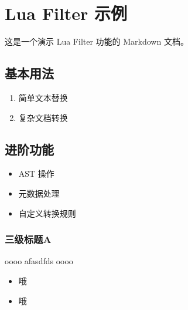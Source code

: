 \section{Lua Filter 示例}\label{lua-filter-ux793aux4f8b}

这是一个演示 Lua Filter 功能的 Markdown 文档。

\subsection{基本用法}\label{ux57faux672cux7528ux6cd5}

\begin{enumerate}
\tightlist
\item
  简单文本替换
\item
  复杂文档转换
\end{enumerate}

\begin{Shaded}
\begin{Highlighting}[]
\OperatorTok{(}\OperatorTok{)}
     \OperatorTok{(}\OperatorTok{)}
\end{Highlighting}
\end{Shaded}

\subsection{进阶功能}\label{ux8fdbux9636ux529fux80fd}

\begin{itemize}
\tightlist
\item
  AST 操作
\item
  元数据处理
\item
  自定义转换规则
\end{itemize}

\subsubsection{三级标题A}\label{ux4e09ux7ea7ux6807ux9898a}

oooo afasdfds oooo

\begin{itemize}
\tightlist
\item
  哦
\item
  哦
\end{itemize}


